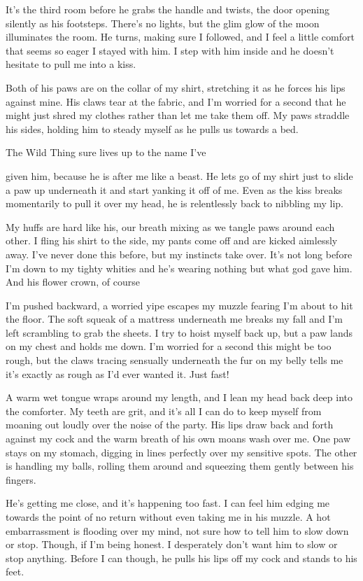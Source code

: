 It's the third room before he grabs the handle and twists, the door
opening silently as his footsteps. There's no lights, but the glim glow
of the moon illuminates the room. He turns, making sure I followed, and
I feel a little comfort that seems so eager I stayed with him. I step
with him inside and he doesn't hesitate to pull me into a kiss.

Both of his paws are on the collar of my shirt, stretching it as he
forces his lips against mine. His claws tear at the fabric, and I'm
worried for a second that he might just shred my clothes rather than let
me take them off. My paws straddle his sides, holding him to steady
myself as he pulls us towards a bed.

The Wild Thing sure lives up to the name I've

given him, because he is after me like a beast. He lets go of my shirt
just to slide a paw up underneath it and start yanking it off of me.
Even as the kiss breaks momentarily to pull it over my head, he is
relentlessly back to nibbling my lip.

My huffs are hard like his, our breath mixing as we tangle paws around
each other. I fling his shirt to the side, my pants come off and are
kicked aimlessly away. I've never done this before, but my instincts
take over. It's not long before I'm down to my tighty whities and he's
wearing nothing but what god gave him. And his flower crown, of course

I'm pushed backward, a worried yipe escapes my muzzle fearing I'm about
to hit the floor. The soft squeak of a mattress underneath me breaks my
fall and I'm left scrambling to grab the sheets. I try to hoist myself
back up, but a paw lands on my chest and holds me down. I'm worried for
a second this might be too rough, but the claws tracing sensually
underneath the fur on my belly tells me it's exactly as rough as I'd
ever wanted it. Just fast!

A warm wet tongue wraps around my length, and I lean my head back deep
into the comforter. My teeth are grit, and it's all I can do to keep
myself from moaning out loudly over the noise of the party. His lips
draw back and forth against my cock and the warm breath of his own moans
wash over me. One paw stays on my stomach, digging in lines perfectly
over my sensitive spots. The other is handling my balls, rolling them
around and squeezing them gently between his fingers.

He's getting me close, and it's happening too fast. I can feel him
edging me towards the point of no return without even taking me in his
muzzle. A hot embarrassment is flooding over my mind, not sure how to
tell him to slow down or stop. Though, if I'm being honest. I
desperately don't want him to slow or stop anything. Before I can
though, he pulls his lips off my cock and stands to his feet.

